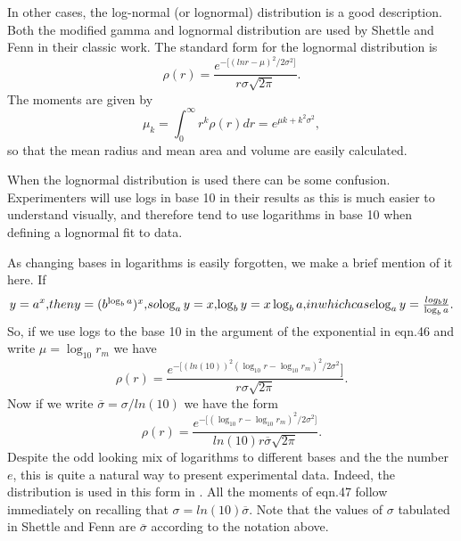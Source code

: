 \begin{flushleft}
In other cases, the log-normal (or lognormal) distribution is a good description.
Both the modified gamma and lognormal distribution are used by
Shettle and Fenn \cite{ShettleFenn:Mybib} in their classic work.
The standard form for the lognormal distribution is
\begin{equation}
\rho(r)= \frac{ e^{-\lbrack (ln r-\mu)^2/2 \sigma^2 \rbrack} }{ r \sigma \sqrt{2 \pi}}.
\end{equation}
The moments are given by
\begin{equation}
\mu_k= \int_0^\infty r^k \rho(r) dr=e^{\mu k +k^2 \sigma^2},
\end{equation}
so that the mean radius and mean area and volume are easily calculated.

When the lognormal distribution is used there can be some confusion.
Experimenters will use logs in base 10 in their results as this is much 
easier to understand visually, and therefore tend to use logarithms in base 10
when defining a lognormal fit to data.

As changing bases in logarithms is easily forgotten, we make a brief mention
of it here. If
\begin{equation}
y=a^x,
$$ then  $$
y=(b^{\log_b a})^x,
$$    so $$
\log_a y = x, 
$$    $$
\log_b y = x \log_b a,
$$ in which case $$
\log_a y= \frac{log_b y}{\log_b a}.
\end{equation}
So, if we use  logs to the base 10 in the argument of the exponential in eqn.46
and write $\mu =\log_{10} r_m$ we have
\begin{equation}
\rho(r)= \frac{ e^{ -\lbrack (ln(10))^2(\log_{10} r  -\log_{10} r_m)^2/2 \sigma^2}\rbrack }{ r \sigma \sqrt{2 \pi}}.
\end{equation}
Now if we write $ {\overline \sigma} = \sigma/ln(10)$ we have the form
\begin{equation}
\rho(r)= \frac{ e^{ -\lbrack(\log_{10} r  -\log_{10} r_m)^2/2 \sigma^2 \rbrack} }{ln(10) r {\overline\sigma} \sqrt{2 \pi}}.
\end{equation}
Despite the odd looking mix of logarithms to different bases and the the number $e$,
this is quite a natural way to present experimental data. Indeed, the distribution
is used in this form in \cite{ShettleFenn:Mybib}. All the moments of eqn.47 follow 
immediately on recalling that $\sigma = ln(10) {\overline \sigma}$. Note
that the values of $\sigma$ tabulated in Shettle and Fenn are ${\overline \sigma}$
according to the notation above.


\end{flushleft}
